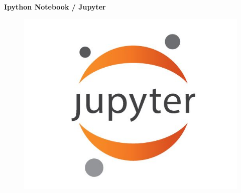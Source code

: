 \documentclass[MASTER.tex]{subfiles}
\begin{document}
\begin{frame}
	\textbf{Ipython Notebook / Jupyter}
	\vspace{-0.4cm}
	\begin{figure}
\centering
\includegraphics[width=0.8\linewidth]{jupyter}

\end{figure}

\end{frame}
	
\end{document}
